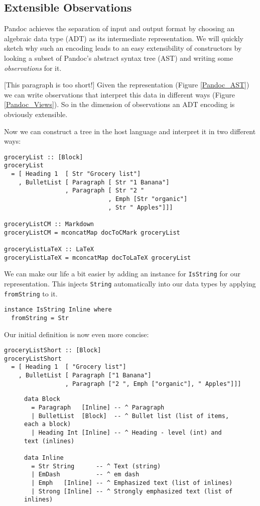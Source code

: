 \subsection{Extensible Observations}

Pandoc achieves the separation of input and output format by choosing an
algebraic data type (ADT) as its intermediate representation. We will quickly
sketch why such an encoding leads to an easy extensibility of constructors by
looking a subset of Pandoc's abstract syntax tree (AST) and writing some
\emph{observations} for it.

[This paragraph is too short!]
Given the representation (Figure \ref{Pandoc_AST}) we can write observations that
interpret this data in different ways (Figure \ref{Pandoc_Views}). So in the
dimension of observations an ADT encoding is obviously extensible.

Now we can construct a tree in the host language and interpret it in two
different ways:
\begin{lstlisting}
groceryList :: [Block]
groceryList
  = [ Heading 1  [ Str "Grocery list"]
    , BulletList [ Paragraph [ Str "1 Banana"]
                 , Paragraph [ Str "2 "
                             , Emph [Str "organic"]
                             , Str " Apples"]]]

groceryListCM :: Markdown
groceryListCM = mconcatMap docToCMark groceryList

groceryListLaTeX :: LaTeX
groceryListLaTeX = mconcatMap docToLaTeX groceryList
\end{lstlisting}

We can make our life a bit easier by adding an instance for \texttt{IsString}
for our representation. This injects \texttt{String} automatically into our data
types by applying \texttt{fromString} to it.

\begin{lstlisting}
instance IsString Inline where
  fromString = Str
\end{lstlisting}


Our initial definition is now even more concise:

\begin{lstlisting}
groceryListShort :: [Block]
groceryListShort
  = [ Heading 1  [ "Grocery list"]
    , BulletList [ Paragraph ["1 Banana"]
                 , Paragraph ["2 ", Emph ["organic"], " Apples"]]]
\end{lstlisting}

\begin{figure}
\begin{lstlisting}
data Block
  = Paragraph   [Inline] -- ^ Paragraph
  | BulletList  [Block]  -- ^ Bullet list (list of items, each a block)
  | Heading Int [Inline] -- ^ Heading - level (int) and text (inlines)
  
data Inline
  = Str String      -- ^ Text (string)
  | EmDash          -- ^ em dash
  | Emph   [Inline] -- ^ Emphasized text (list of inlines)
  | Strong [Inline] -- ^ Strongly emphasized text (list of inlines)
\end{lstlisting}
\end{figure}

